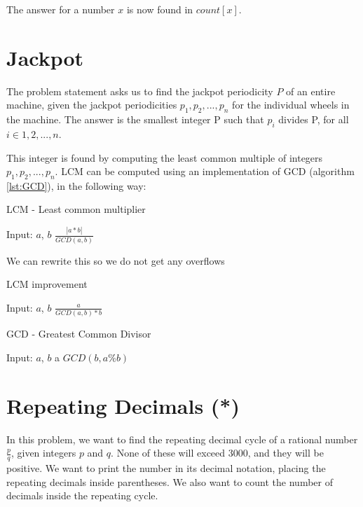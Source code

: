 \documentclass[11pt,a4paper,twoside]{article}
\begin{document}
The answer for a number $x$ is now found in $count[x]$.
\section{Jackpot}

The problem statement asks us to find the jackpot periodicity $P$ of an entire
machine, given the jackpot periodicities $p_{1},p_{2},...,p_{n}$ for the
individual wheels in the machine. The answer is the smallest integer P such
that $p_{i}$ divides P, for all $i \in {1,2,...,n}$.

This integer is found by computing the least common multiple of integers
$p_{1},p_{2},...,p_{n}$. LCM can be computed using an implementation of GCD
(algorithm \ref{lst:GCD}), in the following way:

\begin{algorithm}
    \caption{LCM - Least common multiplier}
    \label{lst:LCM}
    \begin{algorithmic}
        \REQUIRE Input: $a$, $b$
        \RETURN $ \frac{|a * b|}{GCD(a, b)}$
    \end{algorithmic}
\end{algorithm}

We can rewrite this so we do not get any overflows

\begin{algorithm}
    \caption{LCM improvement}
    \label{lst:LCM improvement}
    \begin{algorithmic}
        \REQUIRE Input: $a$, $b$
        \RETURN $\frac{a}{GCD(a, b) * b}$
    \end{algorithmic}
\end{algorithm}

\begin{algorithm}
    \caption{GCD - Greatest Common Divisor}
    \label{lst:GCD}
    \begin{algorithmic}
        \REQUIRE Input: $a$, $b$
            \RETURN a
        \ENDIF
        \RETURN $GCD(b, a \% b)$
    \end{algorithmic}
\end{algorithm}



\section{Repeating Decimals (*)}

In this problem, we want to find the repeating decimal cycle of a rational
number $\frac{p}{q}$, given integers $p$ and $q$. None of these will exceed $3000$, and
they will be positive. We want to print the number in its decimal notation,
placing the repeating decimals inside parentheses. We also want to count the
number of decimals inside the repeating cycle.
\end{document}
